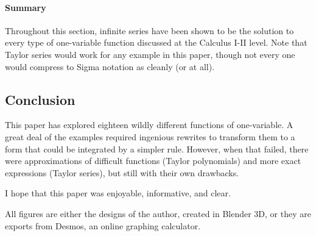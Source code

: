 \documentclass{article}
\newcounter{example}%
\begin{document}
\paragraph{Summary} Throughout this section, infinite series have been shown to be the solution to every type of one-variable function discussed at the Calculus I-II level. Note that Taylor series would work for any example in this paper, though not every one would compress to Sigma notation as cleanly (or at all).
\newpage



\setcounter{secnumdepth}{0}
\begin{center}
\section{Conclusion}
\end{center}
This paper has explored eighteen wildly different functions of one-variable. A great deal of the examples required ingenious rewrites to transform them to a form that could be integrated by a simpler rule. However, when that failed, there were approximations of difficult functions (Taylor polynomials) and more exact expressions (Taylor series), but still with their own drawbacks.\par
I hope that this paper was enjoyable, informative, and clear.

\vspace{4em}
\noindent All figures are either the designs of the author, created in Blender 3D, or they are exports from Desmos, an online graphing calculator.
\end{document}
